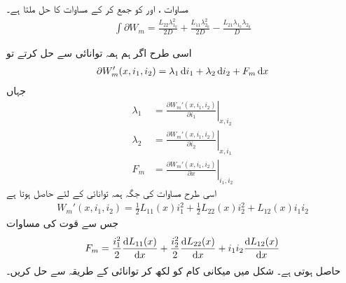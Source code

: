 مساوات  ،  اور    کو جمع کر کے مساوات    کا حل ملتا ہے۔
\begin{align}\label{مساوات_تبادلہ_اصل_راستے_تکمل_کا_جواب}
\int \partial W_m=\frac{L_{22} \lambda_{1_0}^2}{2D}+\frac{L_{11} \lambda_{2_0}^2}{2D}-\frac{L_{21}\lambda_{1_0} \lambda_{2_0}}{D}
\end{align}

اسی طرح اگر ہم ہمہ توانائی سے حل کرتے تو
\begin{align}
\partial W_m'(x,i_1,i_2)=\lambda_1 \dif i_1+\lambda_2 \dif i_2+F_m \dif x
\end{align}
جہاں
\begin{align}
\lambda_1&=\left. \frac{\partial W_m'(x,i_1,i_2)}{\partial i_1} \right|_{x,i_2}\\
\lambda_2&=\left. \frac{\partial W_m'(x,i_1,i_2)}{\partial i_2} \right|_{x,i_1}\\
F_m&=\left. \frac{\partial W_m'(x,i_1,i_2)}{\partial x} \right|_{i_1,i_2}
\end{align}
اسی طرح مساوات   کی جگہ ہمہ توانائی کے لئے حاصل ہوتا ہے
\begin{align}
W_m'(x,i_1,i_2)=\frac{1}{2}L_{11}(x) i_1^2+\frac{1}{2} L_{22}(x) i_2^2+L_{12}(x)i_1 i_2
\end{align}
جس سے قوت کی مساوات
\begin{align}
F_m=\frac{i_1^2}{2} \frac{\dif L_{11}(x)}{\dif x}+\frac{i_2^2}{2}\frac{\dif L_{22}(x)}{\dif x}+i_1 i_2 \frac{\dif L_{12}(x)}{\dif x}
\end{align}
حاصل ہوتی ہے۔
%
شکل   میں میکانی کام کو   لکھ کر توانائی کے طریقہ سے حل کریں۔

